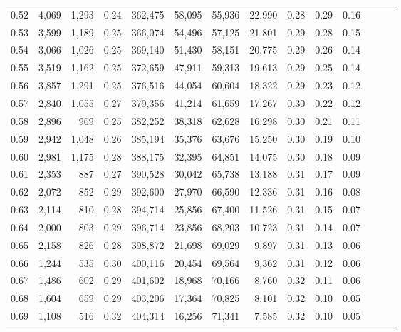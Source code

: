\begin{tabular}{rrrrrrrrrrrrrr}
0.52 &   4,069 &  1,293 &  0.24 &  362,475 &   58,095 &  55,936 &  22,990 &  0.28 &  0.29 &      0.16 \\
0.53 &   3,599 &  1,189 &  0.25 &  366,074 &   54,496 &  57,125 &  21,801 &  0.29 &  0.28 &      0.15 \\
0.54 &   3,066 &  1,026 &  0.25 &  369,140 &   51,430 &  58,151 &  20,775 &  0.29 &  0.26 &      0.14 \\
0.55 &   3,519 &  1,162 &  0.25 &  372,659 &   47,911 &  59,313 &  19,613 &  0.29 &  0.25 &      0.14 \\
0.56 &   3,857 &  1,291 &  0.25 &  376,516 &   44,054 &  60,604 &  18,322 &  0.29 &  0.23 &      0.12 \\
0.57 &   2,840 &  1,055 &  0.27 &  379,356 &   41,214 &  61,659 &  17,267 &  0.30 &  0.22 &      0.12 \\
0.58 &   2,896 &    969 &  0.25 &  382,252 &   38,318 &  62,628 &  16,298 &  0.30 &  0.21 &      0.11 \\
0.59 &   2,942 &  1,048 &  0.26 &  385,194 &   35,376 &  63,676 &  15,250 &  0.30 &  0.19 &      0.10 \\
0.60 &   2,981 &  1,175 &  0.28 &  388,175 &   32,395 &  64,851 &  14,075 &  0.30 &  0.18 &      0.09 \\
0.61 &   2,353 &    887 &  0.27 &  390,528 &   30,042 &  65,738 &  13,188 &  0.31 &  0.17 &      0.09 \\
0.62 &   2,072 &    852 &  0.29 &  392,600 &   27,970 &  66,590 &  12,336 &  0.31 &  0.16 &      0.08 \\
0.63 &   2,114 &    810 &  0.28 &  394,714 &   25,856 &  67,400 &  11,526 &  0.31 &  0.15 &      0.07 \\
0.64 &   2,000 &    803 &  0.29 &  396,714 &   23,856 &  68,203 &  10,723 &  0.31 &  0.14 &      0.07 \\
0.65 &   2,158 &    826 &  0.28 &  398,872 &   21,698 &  69,029 &   9,897 &  0.31 &  0.13 &      0.06 \\
0.66 &   1,244 &    535 &  0.30 &  400,116 &   20,454 &  69,564 &   9,362 &  0.31 &  0.12 &      0.06 \\
0.67 &   1,486 &    602 &  0.29 &  401,602 &   18,968 &  70,166 &   8,760 &  0.32 &  0.11 &      0.06 \\
0.68 &   1,604 &    659 &  0.29 &  403,206 &   17,364 &  70,825 &   8,101 &  0.32 &  0.10 &      0.05 \\
0.69 &   1,108 &    516 &  0.32 &  404,314 &   16,256 &  71,341 &   7,585 &  0.32 &  0.10 &      0.05 \\

\end{tabular}
